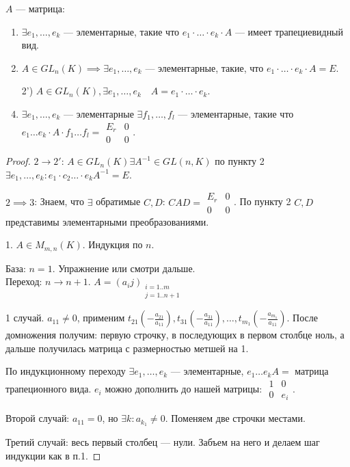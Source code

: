 \begin{theorem}
    $A$ --- матрица:
     \begin{enumerate}
         \item $\exists e_1, \ldots, e_k$ --- элементарные, такие что $e_1 \cdot \ldots \cdot e_k \cdot A$ --- имеет трапециевидный вид. 
         \item $A \in GL_n(K) \implies \exists e_1, \ldots, e_k$ --- элементарные, такие, что $e_1 \cdot \ldots \cdot e_k \cdot A = E$.
         \item[2')] $A \in GL_n(K), \exists e_1, \ldots, e_k \quad A=e_1 \cdot \ldots \cdot e_k$.
         \item $\exists e_1, \ldots, e_k$ --- элементарные $\exists f_1,\ldots, f_l$ --- элементарные, такие что $e_1 \ldots e_k \cdot A \cdot f_1 \ldots f_l = \begin{array}{|c|c|} E_r & 0 \\ \hline 0 & 0 \end{array}$.
    \end{enumerate}
\end{theorem}
\begin{proof}
    $2 \to 2'$:  $A \in GL_n(K) \exists A^{-1} \in GL(n, K)$ по пункту 2  $\exists e_1, \ldots, e_k\!: e_1 \cdot c_2 \ldots \cdot e_k A^{-1} = E$.

    $2 \implies 3$: Знаем, что  $\exists$ обратимые  $C, D$:  $CAD = \begin{array}{|c|c|} E_r & 0 \\ \hline 0 & 0 \end{array}$. По пункту 2  $C, D$ представимы элементарными преобразованиями. 

    1. $A \in M_{m, n}(K)$. Индукция по  $n$.

    База:  $n = 1$. Упражнение или смотри дальше.\\
    Переход:  $n \to n+1$.  $A = (a_ij)_{\substack{i = 1..m \\ j=1..{n+1}}}$

    1 случай. $a_{11} \neq 0$, применим $t_{21}(-\frac{a_{21}}{a_{11}}), t_{31}(-\frac{a_{31}}{a_{11}}),\ldots, t_{m_1}(-\frac{a_{m_1}}{a_{11}})$. После домножения получим: первую строчку, в последующих в первом столбце ноль, а дальше получилась матрица с размерностью метшей на 1.

    По индукционному переходу $\exists e_1, \ldots, e_k$ --- элементарные, $e_1 \ldots e_k A = $ матрица трапеционного вида. $e_i$ можно дополнить до нашей матрицы:  $\begin{array}{c|c} 1 & 0 \\ \hline 0 & e_i \end{array}$.

    Второй случай:  $a_{11} = 0$, но $\exists k\!: a_{k_1} \neq 0$. Поменяем две строчки местами.

    Третий случай: весь первый столбец --- нули. Забъем на него и делаем шаг индукции как в п.1.
\end{proof}
